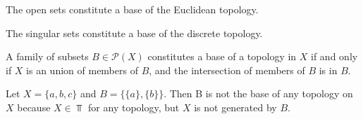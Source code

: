 \documentclass[../../main/main.tex]{subfiles}
\begin{document}
\begin{example}
  The open sets constitute a base of the Euclidean topology.
\end{example}

\begin{example}
  The singular sets constitute a base of the discrete topology.
\end{example}

\begin{definition}
  A family of subsets $B \in \mathcal{P}(X)$ constitutes a base of a topology in $X$ if and only if $X$ is an union of members of $B$, and the intersection of members of $B$ is in $B$.
\end{definition}

\begin{example}
  Let $X = \{a, b, c\}$ and $B = \{ \{a\}, \{b\}\}$. Then B is not the base of any topology on $X$ because $X \in \Top$ for any topology, but $X$ is not generated by $B$.
\end{example}
\end{document}
